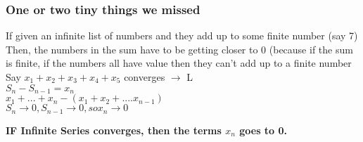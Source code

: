\documentclass[]{article}
\begin{document}
    \subsubsection*{One or two tiny things we missed}
   If given an infinite list of numbers and they add up to some finite number (say 7)
    \\
    Then, the numbers in the sum have to be getting closer to 0 (because if the sum is finite, if the numbers all have value then they can't add up to a finite number
    \\
    Say $x_1 + x_2 + x_3 + x_4 + x_5$ converges $\to$ L
    \\
    $S_n - S_{n-1} = x_n$ 
    \\
    $x_1 +...+x_n - (x_1 + x_2 +....x_{n-1})$
    \\
    $S_n \to 0, S_{n-1} \to 0, so x_n \to 0$

    \textbf{IF Infinite Series converges, then the terms $x_n$ goes to 0.}
\end{document}
